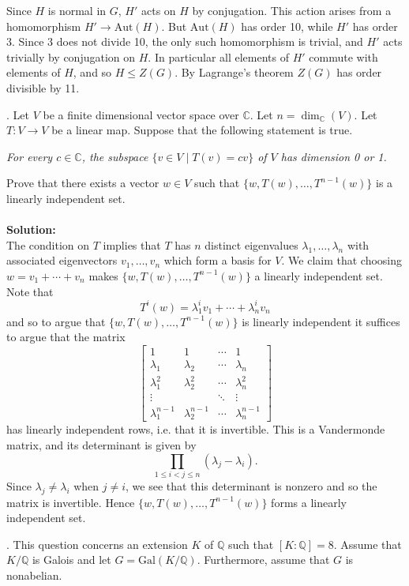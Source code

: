 \documentclass[11pt]{article}
\newcommand{\Q}{\mathbb{Q}}
\newcommand{\C}{\mathbb{C}}
\begin{document}
Since $H$ is normal in $G$, $H'$ acts on $H$ by conjugation. This action arises from a homomorphism $H'\to \mbox{Aut}(H)$. But $\mbox{Aut}(H)$ has order 10, while $H'$ has order 3. Since 3 does not divide 10, the only such homomorphism is trivial, and $H'$ acts trivially by conjugation on $H$. In particular all elements of $H'$ commute with elements of $H$, and so $H\le Z(G)$. By Lagrange's theorem $Z(G)$ has order divisible by 11. 

. Let $V$ be a finite dimensional vector space over $\C$. Let $n = \dim_\C(V )$. Let
$T : V \to V$ be a linear map. Suppose that the following statement is true.

\emph{For every $c \in\C$, the subspace $\{v\in V\mid T(v) = cv\}$ of $V$ has dimension 0 or 1.}

Prove that there exists a vector $w \in V$ such that $\{w, T(w), \ldots, T^{n-1}
(w)\}$ is a linearly
independent set.\\\\\textbf{Solution:}\\
The condition on $T$ implies that $T$ has $n$ distinct eigenvalues $\lambda_1,\ldots, \lambda_n$ with associated eigenvectors $v_1,\ldots, v_n$ which form a basis for $V$. We claim that choosing $w = v_1+\cdots +v_n$ makes $\{w,T(w),\ldots, T^{n-1}(w)\}$ a linearly independent set. Note that \[
T^i(w) = \lambda_1^i v_1 + \cdots + \lambda_n^i v_n
\]
and so to argue that $\{w,T(w),\ldots, T^{n-1}(w)\}$ is linearly independent it suffices to argue that the matrix \[
\begin{bmatrix}
1 & 1 &\cdots & 1\\
\lambda_1 & \lambda_2 & \cdots & \lambda_n \\
\lambda_1^2 & \lambda_2^2 &\cdots & \lambda_n^2\\
\vdots &&\ddots & \vdots \\
\lambda_1^{n-1} & \lambda_2^{n-1} & \cdots & \lambda_n^{n-1}
\end{bmatrix}
\]
has linearly independent rows, i.e. that it is invertible. 
This is a Vandermonde matrix, and its determinant is given by \[
\prod_{1\le i< j \le n} (\lambda_j-\lambda_i).
\]
Since $\lambda_j \neq \lambda_i$ when $j\neq i$, we see that this determinant is nonzero and so the matrix is invertible. Hence $\{w,T(w),\ldots, T^{n-1}(w)\}$ forms a linearly independent set. 

. This question concerns an extension $K$ of $\Q$ such that $[K :\Q] = 8$. Assume
that $K/\Q$ is Galois and let $G = \mbox{Gal}(K/\Q)$. Furthermore, assume that $G$ is nonabelian.
\end{document}
